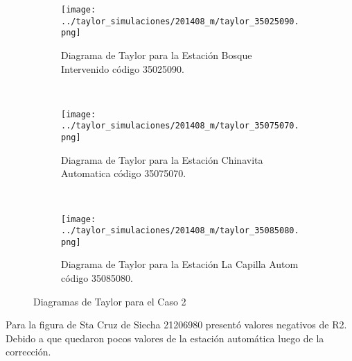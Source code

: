 \begin{figure}[H]\ContinuedFloat
\begin{subfigure}[normla]{0.5\textwidth}
\caption{Diagrama de Taylor para la Estación Bosque Intervenido   código 35025090.}
\texttt{[image: ../taylor\_simulaciones/201408\_m/taylor\_35025090.png]}
\end{subfigure}
~
\begin{subfigure}[normla]{0.5\textwidth}
\caption{Diagrama de Taylor para la Estación Chinavita Automatica código 35075070.}
\texttt{[image: ../taylor\_simulaciones/201408\_m/taylor\_35075070.png]}
\end{subfigure}
~
\begin{subfigure}[normla]{0.5\textwidth}
\caption{Diagrama de Taylor para la Estación La Capilla Autom código 35085080.}
\texttt{[image: ../taylor\_simulaciones/201408\_m/taylor\_35085080.png]}
\end{subfigure}


         
\caption{Diagramas de Taylor para el Caso 2}
\label{caso2}
\end{figure}
Para la figura de Sta Cruz de Siecha 21206980 presentó valores negativos de R2. Debido a que quedaron pocos valores de la estación automática luego de la corrección.





%
%
%



